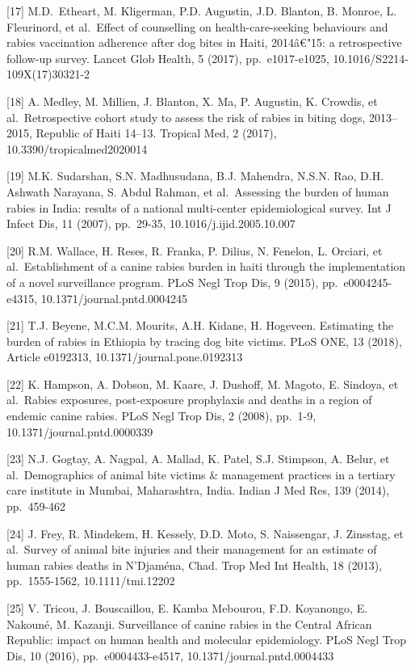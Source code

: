 \documentclass[
  oneside]{book}
\begin{document}
{[}17{]} M.D.~Etheart, M. Kligerman, P.D. Augustin, J.D. Blanton, B. Monroe, L. Fleurinord, et al.~Effect of counselling on health-care-seeking behaviours and rabies vaccination adherence after dog bites in Haiti, 2014â€"15: a retrospective follow-up survey. Lancet Glob Health, 5 (2017), pp.~e1017-e1025, 10.1016/S2214-109X(17)30321-2

{[}18{]} A. Medley, M. Millien, J. Blanton, X. Ma, P. Augustin, K. Crowdis, et al.~Retrospective cohort study to assess the risk of rabies in biting dogs, 2013--2015, Republic of Haiti 14--13. Tropical Med, 2 (2017), 10.3390/tropicalmed2020014

{[}19{]} M.K. Sudarshan, S.N. Madhusudana, B.J. Mahendra, N.S.N. Rao, D.H. Ashwath Narayana, S. Abdul Rahman, et al.~Assessing the burden of human rabies in India: results of a national multi-center epidemiological survey. Int J Infect Dis, 11 (2007), pp.~29-35, 10.1016/j.ijid.2005.10.007

{[}20{]} R.M. Wallace, H. Reses, R. Franka, P. Dilius, N. Fenelon, L. Orciari, et al.~Establishment of a canine rabies burden in haiti through the implementation of a novel surveillance program. PLoS Negl Trop Dis, 9 (2015), pp.~e0004245-e4315, 10.1371/journal.pntd.0004245

{[}21{]} T.J. Beyene, M.C.M. Mourits, A.H. Kidane, H. Hogeveen. Estimating the burden of rabies in Ethiopia by tracing dog bite victims. PLoS ONE, 13 (2018), Article e0192313, 10.1371/journal.pone.0192313

{[}22{]} K. Hampson, A. Dobson, M. Kaare, J. Dushoff, M. Magoto, E. Sindoya, et al.~Rabies exposures, post-exposure prophylaxis and deaths in a region of endemic canine rabies. PLoS Negl Trop Dis, 2 (2008), pp.~1-9, 10.1371/journal.pntd.0000339

{[}23{]} N.J. Gogtay, A. Nagpal, A. Mallad, K. Patel, S.J. Stimpson, A. Belur, et al.~Demographics of animal bite victims \& management practices in a tertiary care institute in Mumbai, Maharashtra, India. Indian J Med Res, 139 (2014), pp.~459-462

{[}24{]} J. Frey, R. Mindekem, H. Kessely, D.D. Moto, S. Naissengar, J. Zinsstag, et al.~Survey of animal bite injuries and their management for an estimate of human rabies deaths in N'Djaména, Chad. Trop Med Int Health, 18 (2013), pp.~1555-1562, 10.1111/tmi.12202

{[}25{]} V. Tricou, J. Bouscaillou, E. Kamba Mebourou, F.D. Koyanongo, E. Nakouné, M. Kazanji. Surveillance of canine rabies in the Central African Republic: impact on human health and molecular epidemiology. PLoS Negl Trop Dis, 10 (2016), pp.~e0004433-e4517, 10.1371/journal.pntd.0004433
\end{document}
